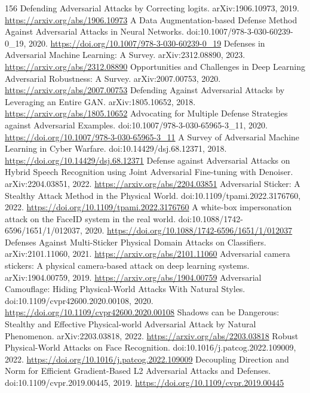 \documentclass[11pt]{article}
\begin{document}
\begin{thebibliography}{156}
 Defending Adversarial Attacks by Correcting logits. arXiv:1906.10973, 2019. \url{https://arxiv.org/abs/1906.10973}
 A Data Augmentation-based Defense Method Against Adversarial Attacks in Neural Networks. doi:10.1007/978-3-030-60239-0\_19, 2020. \url{https://doi.org/10.1007/978-3-030-60239-0_19}
 Defenses in Adversarial Machine Learning: A Survey. arXiv:2312.08890, 2023. \url{https://arxiv.org/abs/2312.08890}
 Opportunities and Challenges in Deep Learning Adversarial Robustness: A Survey. arXiv:2007.00753, 2020. \url{https://arxiv.org/abs/2007.00753}
 Defending Against Adversarial Attacks by Leveraging an Entire GAN. arXiv:1805.10652, 2018. \url{https://arxiv.org/abs/1805.10652}
 Advocating for Multiple Defense Strategies against Adversarial Examples. doi:10.1007/978-3-030-65965-3\_11, 2020. \url{https://doi.org/10.1007/978-3-030-65965-3_11}
 A Survey of Adversarial Machine Learning in Cyber Warfare. doi:10.14429/dsj.68.12371, 2018. \url{https://doi.org/10.14429/dsj.68.12371}
 Defense against Adversarial Attacks on Hybrid Speech Recognition using Joint Adversarial Fine-tuning with Denoiser. arXiv:2204.03851, 2022. \url{https://arxiv.org/abs/2204.03851}
 Adversarial Sticker: A Stealthy Attack Method in the Physical World. doi:10.1109/tpami.2022.3176760, 2022. \url{https://doi.org/10.1109/tpami.2022.3176760}
 A white-box impersonation attack on the FaceID system in the real world. doi:10.1088/1742-6596/1651/1/012037, 2020. \url{https://doi.org/10.1088/1742-6596/1651/1/012037}
 Defenses Against Multi-Sticker Physical Domain Attacks on Classifiers. arXiv:2101.11060, 2021. \url{https://arxiv.org/abs/2101.11060}
 Adversarial camera stickers: A physical camera-based attack on deep learning systems. arXiv:1904.00759, 2019. \url{https://arxiv.org/abs/1904.00759}
 Adversarial Camouflage: Hiding Physical-World Attacks With Natural Styles. doi:10.1109/cvpr42600.2020.00108, 2020. \url{https://doi.org/10.1109/cvpr42600.2020.00108}
 Shadows can be Dangerous: Stealthy and Effective Physical-world Adversarial Attack by Natural Phenomenon. arXiv:2203.03818, 2022. \url{https://arxiv.org/abs/2203.03818}
 Robust Physical-World Attacks on Face Recognition. doi:10.1016/j.patcog.2022.109009, 2022. \url{https://doi.org/10.1016/j.patcog.2022.109009}
 Decoupling Direction and Norm for Efficient Gradient-Based L2 Adversarial Attacks and Defenses. doi:10.1109/cvpr.2019.00445, 2019. \url{https://doi.org/10.1109/cvpr.2019.00445}

\end{thebibliography}
\end{document}
